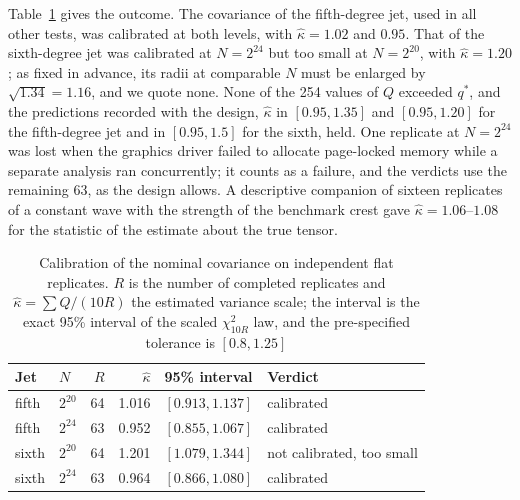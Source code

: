 \documentclass[11pt,a4paper]{article}
\begin{document}
Table~\ref{calibtable} gives the outcome. The covariance of the
fifth-degree jet, used in all other tests, was calibrated at both levels,
with $\hat\kappa=1.02$ and $0.95$. That of the sixth-degree jet was
calibrated at $N=2^{24}$ but too small at $N=2^{20}$, with
$\hat\kappa=1.20$; as fixed in advance, its radii at comparable $N$ must be
enlarged by $\sqrt{1.34}=1.16$, and we quote none. None of the 254 values of
$Q$ exceeded $q^*$, and the predictions recorded with the design,
$\hat\kappa$ in $[0.95,1.35]$ and $[0.95,1.20]$ for the fifth-degree jet and
in $[0.95,1.5]$ for the sixth, held. One replicate at $N=2^{24}$ was lost
when the graphics driver failed to allocate page-locked memory while a
separate analysis ran concurrently; it counts as a failure, and the verdicts
use the remaining 63, as the design allows. A descriptive companion of
sixteen replicates of a constant wave with the strength of the benchmark
crest gave $\hat\kappa=1.06$--$1.08$ for the statistic of the estimate about
the true tensor.

\begin{table}[t]
\centering\small
\caption{Calibration of the nominal covariance on independent flat
replicates. $R$ is the number of completed replicates and
$\hat\kappa=\sum Q/(10R)$ the estimated variance scale; the interval is the
exact 95\% interval of the scaled $\chi^2_{10R}$ law, and the pre-specified
tolerance is $[0.8,1.25]$}
\label{calibtable}
\begin{tabular}{llrrll}
\toprule
Jet & $N$ & $R$ & $\hat\kappa$ & 95\% interval & Verdict\\
\midrule
fifth & $2^{20}$ & 64 & 1.016 & $[0.913,1.137]$ & calibrated\\
fifth & $2^{24}$ & 63 & 0.952 & $[0.855,1.067]$ & calibrated\\
sixth & $2^{20}$ & 64 & 1.201 & $[1.079,1.344]$ & not calibrated, too small\\
sixth & $2^{24}$ & 63 & 0.964 & $[0.866,1.080]$ & calibrated\\
\bottomrule
\end{tabular}
\end{table}
\end{document}
